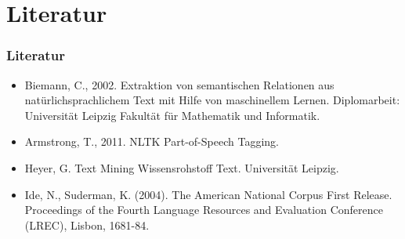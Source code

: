 \section{Literatur}
\label{sec:literatur}

\begin{frame}
  \frametitle{Literatur}

  \begin{itemize}
  \item Biemann, C., 2002. Extraktion von semantischen Relationen aus
    natürlichsprachlichem Text mit Hilfe von maschinellem Lernen.
    Diplomarbeit: Universität Leipzig Fakultät für Mathematik und
    Informatik.
  \item Armstrong, T., 2011. NLTK Part-of-Speech Tagging.
  \item Heyer, G. Text Mining Wissensrohstoff Text. Universität
    Leipzig.
  \item Ide, N., Suderman, K. (2004). The American National Corpus
    First Release. Proceedings of the Fourth Language Resources and
    Evaluation Conference (LREC), Lisbon, 1681-84. 
  \end{itemize}
\end{frame}